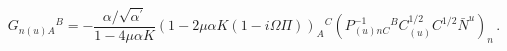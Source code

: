 \begin{equation}
G_{n(u)A}{}^B=-\frac{\alpha/\sqrt{\alpha^\prime}}{1-4\mu\alpha K}(1-2\mu\alpha K(1-i\Omega\Pi))_A{}^C
(P^{-1}_{(u)nC}{}^BC^{1/2}_{(u)}C^{1/2}{\bar N}^u)_n\,.
\end{equation}

